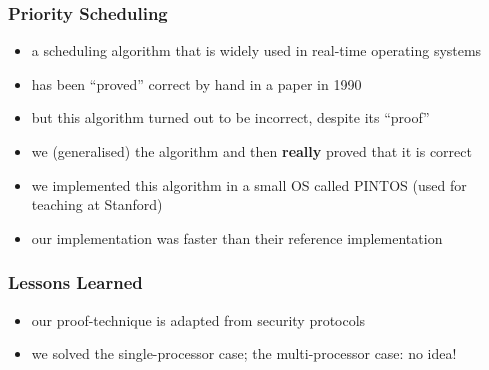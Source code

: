 \documentclass[dvipsnames,14pt,t]{beamer}
\begin{document}
  \begin{frame}[c]
  \frametitle{Priority Scheduling}

  \begin{itemize}
  \item a scheduling algorithm that is widely used in real-time operating systems
  \item has been ``proved'' correct by hand in a paper in 1990
  \item but this algorithm turned out to be incorrect, despite its ``proof''\bigskip\pause
  
  \item we (generalised) the algorithm and then {\bf really} proved that it is correct	
  \item we implemented this algorithm in a small OS called PINTOS (used for teaching at Stanford)
  \item our implementation was faster than their reference implementation
  \end{itemize}

  \end{frame}
   
  \begin{frame}[c]
  \frametitle{Lessons Learned}

  \begin{itemize}
  \item our proof-technique is adapted from security 
  protocols\bigskip
 

  \item we solved the single-processor case; the multi-processor 
  case: no idea!
  \end{itemize}

  \end{frame}
\end{document}
